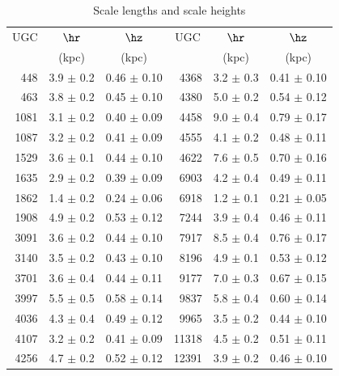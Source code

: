 %
\begin{table}[t]
\caption{\label{tab:hRhz}
Scale lengths and scale heights}
\centering
%
\begin{tabular}{|r r r |r r r|}
\hline
\multicolumn{1}{|c}{UGC}         & 
\multicolumn{1}{c}{$\hr$}        & 
\multicolumn{1}{c}{$\hz$}        &
\multicolumn{1}{|c}{UGC}         & 
\multicolumn{1}{c}{$\hr$}        & 
\multicolumn{1}{c|}{$\hz$}       \\
%
\multicolumn{1}{|c}{}            &
\multicolumn{1}{c}{(kpc)}        &
\multicolumn{1}{c}{(kpc)}        &
\multicolumn{1}{|c}{}            &
\multicolumn{1}{c}{(kpc)}        &
\multicolumn{1}{c|}{(kpc)}       \\
%
\hline
  448 & 3.9 $\pm$ 0.2 & 0.46 $\pm$ 0.10 &  4368 & 3.2 $\pm$ 0.3 & 0.41 $\pm$ 0.10 \\
  463 & 3.8 $\pm$ 0.2 & 0.45 $\pm$ 0.10 &  4380 & 5.0 $\pm$ 0.2 & 0.54 $\pm$ 0.12 \\
 1081 & 3.1 $\pm$ 0.2 & 0.40 $\pm$ 0.09 &  4458 & 9.0 $\pm$ 0.4 & 0.79 $\pm$ 0.17 \\
 1087 & 3.2 $\pm$ 0.2 & 0.41 $\pm$ 0.09 &  4555 & 4.1 $\pm$ 0.2 & 0.48 $\pm$ 0.11 \\
 1529 & 3.6 $\pm$ 0.1 & 0.44 $\pm$ 0.10 &  4622 & 7.6 $\pm$ 0.5 & 0.70 $\pm$ 0.16 \\
 1635 & 2.9 $\pm$ 0.2 & 0.39 $\pm$ 0.09 &  6903 & 4.2 $\pm$ 0.4 & 0.49 $\pm$ 0.11 \\
 1862 & 1.4 $\pm$ 0.2 & 0.24 $\pm$ 0.06 &  6918 & 1.2 $\pm$ 0.1 & 0.21 $\pm$ 0.05 \\
 1908 & 4.9 $\pm$ 0.2 & 0.53 $\pm$ 0.12 &  7244 & 3.9 $\pm$ 0.4 & 0.46 $\pm$ 0.11 \\
 3091 & 3.6 $\pm$ 0.2 & 0.44 $\pm$ 0.10 &  7917 & 8.5 $\pm$ 0.4 & 0.76 $\pm$ 0.17 \\
 3140 & 3.5 $\pm$ 0.2 & 0.43 $\pm$ 0.10 &  8196 & 4.9 $\pm$ 0.1 & 0.53 $\pm$ 0.12 \\
 3701 & 3.6 $\pm$ 0.4 & 0.44 $\pm$ 0.11 &  9177 & 7.0 $\pm$ 0.3 & 0.67 $\pm$ 0.15 \\
 3997 & 5.5 $\pm$ 0.5 & 0.58 $\pm$ 0.14 &  9837 & 5.8 $\pm$ 0.4 & 0.60 $\pm$ 0.14 \\
 4036 & 4.3 $\pm$ 0.4 & 0.49 $\pm$ 0.12 &  9965 & 3.5 $\pm$ 0.2 & 0.44 $\pm$ 0.10 \\
 4107 & 3.2 $\pm$ 0.2 & 0.41 $\pm$ 0.09 & 11318 & 4.5 $\pm$ 0.2 & 0.51 $\pm$ 0.11 \\
 4256 & 4.7 $\pm$ 0.2 & 0.52 $\pm$ 0.12 & 12391 & 3.9 $\pm$ 0.2 & 0.46 $\pm$ 0.10 \\
\hline
\end{tabular}
%
\end{table}
